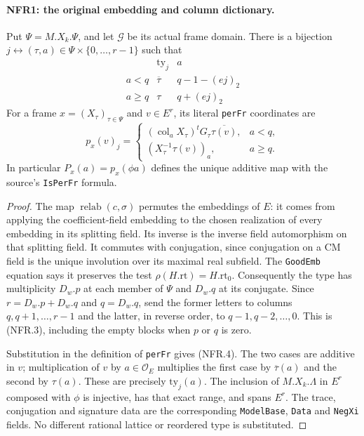 \documentclass[11pt,a4paper]{article}
\numberwithin{equation}{section}
\theoremstyle{remark}\newtheorem{remark}[theorem]{Remark}
\begin{document}
\paragraph{NFR1: the original embedding and column dictionary.}
\label{claim:NFR1}
Put $\Psi=M.X_k.\Psi$, and let $\mathcal G$ be its actual frame
domain.  There is a bijection
$j\leftrightarrow(\tau,a)\in\Psi\times\{0,\ldots,r-1\}$ such that
\[
\begin{array}{c|c|c}
 &\mathrm{ty}_j& a\\ \hline
 a<q&\overline\tau&q-1-(ej)_2\\
 a\ge q&\tau&q+(ej)_2
\end{array}                                                     \tag{NFR.3}
\]
For a frame $x=(X_\tau)_{\tau\in\Psi}$ and $v\in E^r$, its
literal \texttt{per\allowbreak Fr} coordinates are
\[
 p_x(v)_j=
 \begin{cases}
  (\operatorname{col}_aX_\tau)^tG_\tau\overline{\tau(v)},&a<q,\\
  (X_\tau^{-1}\tau(v))_a,&a\ge q.
 \end{cases}                                                    \tag{NFR.4}
\]
In particular $P_x(a)=p_x(\phi a)$ defines the unique additive
map with the source's \texttt{Is\allowbreak Per\allowbreak Fr} formula.

\begin{proof}
The map $\operatorname{relab}(c,\sigma)$ permutes the embeddings
of $E$: it comes from applying the coefficient-field embedding to
the chosen realization of every embedding in its splitting field.
Its inverse is the inverse field automorphism on that splitting field.
It commutes with conjugation, since conjugation on a CM field is
the unique involution over its maximal real subfield.  The
\texttt{Good\allowbreak Emb} equation says it preserves the test
$\rho(H.\mathrm{rt})=H.\mathrm{rt}_0$.
Consequently the type has multiplicity $D_w.p$ at each member of
$\Psi$ and $D_w.q$ at its conjugate.  Since
$r=D_w.p+D_w.q$ and $q=D_w.q$, send the former letters to
columns $q,q+1,\ldots,r-1$ and the latter, in reverse order,
to $q-1,q-2,\ldots,0$.  This is (NFR.3), including the empty
blocks when $p$ or $q$ is zero.

Substitution in the definition of \texttt{per\allowbreak Fr} gives (NFR.4).
The two cases are additive in $v$; multiplication of $v$ by
$a\in\mathcal O_E$ multiplies the first case by $\overline\tau(a)$
and the second by $\tau(a)$.  These are precisely $\mathrm{ty}_j(a)$.
The inclusion of $M.X_k.\Lambda$ in $E^r$ composed with $\phi$
is injective, has that exact range, and spans $E^r$.
The trace, conjugation and signature data are the corresponding
\texttt{Model\allowbreak Base}, \texttt{Data} and \texttt{Neg\allowbreak Xi} fields.
No different rational lattice or reordered type is substituted.
\end{proof}
\end{document}
